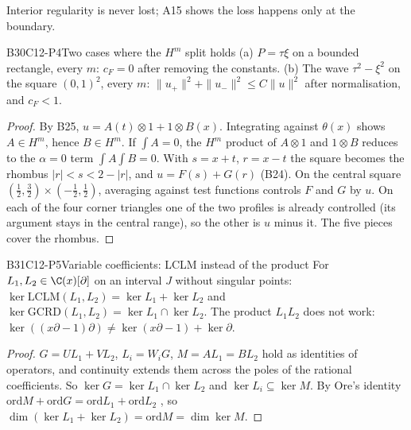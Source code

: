 Interior regularity is never lost; A15 shows the loss happens only at the boundary.

\begin{dimcard}{B30}{C12-P4}{Two cases where the $H^m$ split holds}{\proved}{}
(a) $P=\tau\xi$ on a bounded rectangle, every $m$: $c_F=0$ after removing the constants. (b) The wave $\tau^2-\xi^2$ on the square $(0,1)^2$, every $m$: $\|u_+\|^2+\|u_-\|^2\le C\|u\|^2$ after normalisation, and $c_F<1$.
\end{dimcard}
\begin{proof}
By B25, $u=A(t)\otimes1+1\otimes B(x)$. Integrating against $\theta(x)$ shows $A\in H^m$, hence $B\in H^m$. If $\int A=0$, the $H^m$ product of $A\otimes1$ and $1\otimes B$ reduces to the $\alpha=0$ term $\int A\int B=0$.
With $s=x+t$, $r=x-t$ the square becomes the rhombus $|r|<s<2-|r|$, and $u=F(s)+G(r)$ (B24).
On the central square $(\tfrac12,\tfrac32)\times(-\tfrac12,\tfrac12)$, averaging against test functions controls $F$ and $G$ by $u$. On each of the four corner triangles one of the two profiles is already controlled (its argument stays in the central range), so the other is $u$ minus it. The five pieces cover the rhombus.
\end{proof}

\begin{dimcard}{B31}{C12-P5}{Variable coefficients: LCLM instead of the product}{}{}
For $L_1,L_2\in\C(x)[\partial]$ on an interval $J$ without singular points: $\ker\mathrm{LCLM}(L_1,L_2)=\ker L_1+\ker L_2$ and $\ker\mathrm{GCRD}(L_1,L_2)=\ker L_1\cap\ker L_2$. The product $L_1L_2$ does not work: $\ker((x\partial-1)\partial)\ne\ker(x\partial-1)+\ker\partial$.
\end{dimcard}
\begin{proof}
$G=UL_1+VL_2$, $L_i=W_iG$, $M=AL_1=BL_2$ hold as identities of operators, and continuity extends them across the poles of the rational coefficients. So $\ker G=\ker L_1\cap\ker L_2$ and $\ker L_i\subseteq\ker M$.
By Ore's identity $\mathrm{ord}M+\mathrm{ord}G=\mathrm{ord}L_1+\mathrm{ord}L_2$ \cf, so $\dim(\ker L_1+\ker L_2)=\mathrm{ord}M=\dim\ker M$.
\end{proof}

